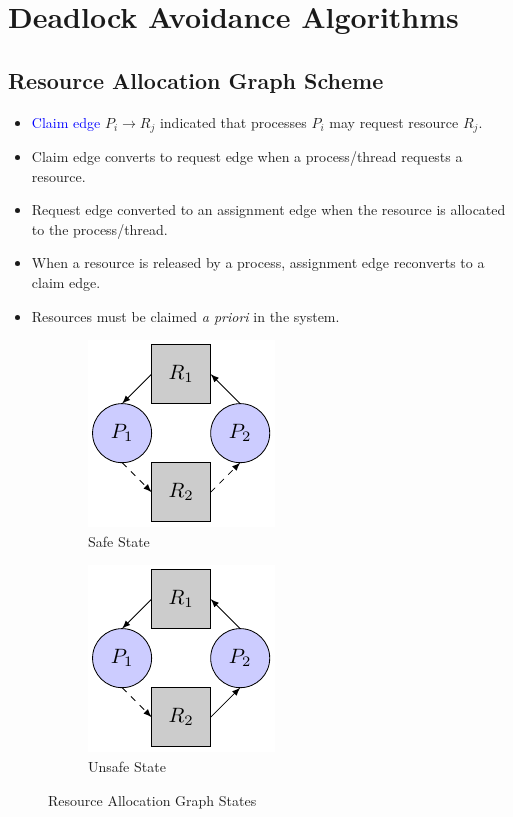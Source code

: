 \documentclass{book/custombook}
\begin{document}
        \section{Deadlock Avoidance Algorithms}
            \subsection{Resource Allocation Graph Scheme}
                \begin{itemize}
                    \item \textcolor{blue}{Claim edge} $P_i \rightarrow R_j$ indicated that processes $P_i$ may request resource
                    $R_j$.
                    \item Claim edge converts to request edge when a process/thread requests a resource.
                    \item Request edge converted to an assignment edge when the resource is allocated to the process/thread.
                    \item When a resource is released by a process, assignment edge reconverts to a claim edge.
                    \item Resources must be claimed \textit{a priori} in the system.
                \end{itemize}
                \begin{figure}[H]
                    \centering
                    \begin{subfigure}{0.5\linewidth}
                        \centering
                        \includegraphics{figures/resource_allocation_safe.pdf}
                        \caption{Safe State}
                    \end{subfigure}%
                    \begin{subfigure}{0.5\linewidth}
                        \centering
                        \includegraphics{figures/resource_allocation_unsafe.pdf}
                        \caption{Unsafe State}
                    \end{subfigure}
                    \caption{Resource Allocation Graph States}
                \end{figure}
\end{document}
